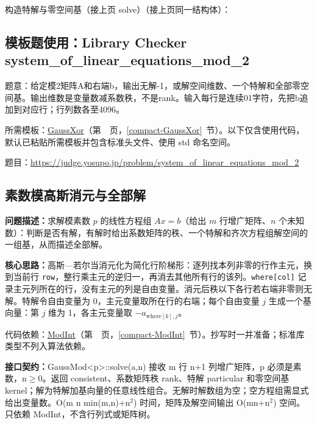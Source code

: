 \newpage

\noindent 构造特解与零空间基（接上页 solve）（接上页同一结构体）：



\Needspace{401pt}

\subsection*{模板题使用：Library Checker system\_of\_linear\_equations\_mod\_2}

\label{usage-example-143}

题意：给定模2矩阵A和右端b，输出无解-1，或解空间维数、一个特解和全部零空间基。输出维数是变量数减系数秩，不是rank。输入每行是连续01字符，先把b追加到对应行；行列数各至4096。

所需模板：\hyperref[compact-GaussXor]{GaussXor}（第~\pageref{compact-GaussXor}~页，\ref{compact-GaussXor}~节）。以下仅含使用代码，默认已粘贴所需模板并包含标准头文件、使用 std 命名空间。

题目：\url{https://judge.yosupo.jp/problem/system_of_linear_equations_mod_2}



\subsection{素数模高斯消元与全部解}\label{compact-GaussMod}

\noindent\textbf{问题描述：}\allowbreak 求解模素数 $p$ 的线性方程组 $Ax=b$（给出 $m$ 行增广矩阵、$n$ 个未知数）：判断是否有解，有解时给出系数矩阵的秩、一个特解和齐次方程组解空间的一组基，从而描述全部解。

\textbf{核心思路：}\allowbreak 高斯—若尔当消元化为简化行阶梯形：逐列找本列非零的行作主元，换到当前行 \texttt{row}，整行乘主元的逆归一，再消去其他所有行的该列。\texttt{where[col]} 记录主元列所在的行，没有主元的列是自由变量。消元后秩以下各行若右端非零则无解。特解令自由变量为 0，主元变量取所在行的右端；每个自由变量 $j$ 生成一个基向量：第 $j$ 维为 1，各主元变量取 $-a_{\mathrm{where}[k],j}$。

代码依赖：\hyperref[compact-ModInt]{ModInt}（第~\pageref{compact-ModInt}~页，\ref{compact-ModInt}~节）。抄写时一并准备；标准库类型不列入算法依赖。

{\sloppy{}\noindent\textbf{接口契约：}GaussMod<p>::solve(a,n) 接收 m 行 n+1 列增广矩阵，p 必须是素数，n$\ge$0。返回 consistent、系数矩阵秩 rank、特解 particular 和零空间基 kernel；解为特解加基向量的任意线性组合。无解时解数组为空；空方程组需显式给出变量数。O(m n min(m,n)+n$^{2}$) 时间，矩阵及解空间输出 O(mn+n$^{2}$) 空间。只依赖 ModInt，不含行列式或矩阵树。\par}

